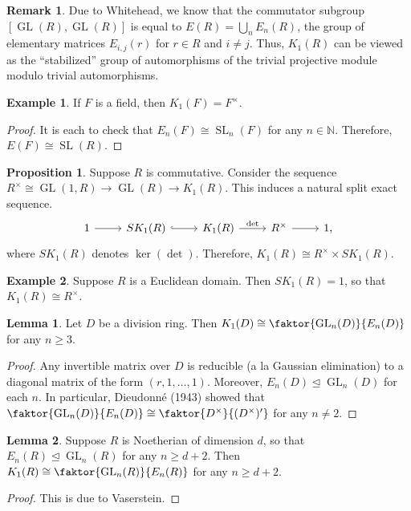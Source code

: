\documentclass[10pt,letterpaper,cm]{nupset}
\theoremstyle{definition}
\newtheorem{exmp}{Example}
\newtheorem{remark}{Remark}
\newtheorem{lemma}{Lemma}
\newtheorem{prop}{Proposition}
\newcommand{\N}{\mathbb N}
\newcommand{\1}{\mathbf{1}}
\newcommand{\0}{\vec 0}
\DeclareMathOperator*{\GL}{GL}
\DeclareMathOperator*{\SL}{SL}
\begin{document}
\begin{remark}
Due to Whitehead, we know that the commutator subgroup $[\GL(R), \GL(R)]$ is equal to $E(R) = \bigcup_n E_n(R)$, the group of elementary matrices $E_{i, j}(r)$ for $r \in R$ and $i\ne j$. Thus, $K_1(R)$ can be viewed as the ``stabilized'' group of automorphisms of the trivial projective module modulo trivial automorphisms.
\end{remark}

\begin{exmp}
If $F$ is a field, then $K_1(F) = F^{\times}$.
\end{exmp}
\begin{proof}
It is each to check that $E_n(F) \cong \SL_n(F)$ for any $n\in \N$. Therefore, $E(F) \cong \SL(R)$.
\end{proof}

\begin{prop}
Suppose $R$ is commutative. Consider the sequence $R^{\times} \cong \GL(1, R) \to \GL(R) \to K_1(R)$. This induces a natural split exact sequence.
\[
\begin{tikzcd}
1 \arrow[r] & SK_1(R) \arrow[r, hook] & K_1(R) \arrow[r, "\det"] & R^{\times} \arrow[r] & 1,
\end{tikzcd}
\]
where $SK_1(R)$ denotes $\ker(\det)$. Therefore, $K_1(R) \cong R^{\times} \times SK_1(R)$.
\end{prop}

\begin{exmp}
Suppose $R$ is a Euclidean domain. Then $SK_1(R) =1$, so that $K_1(R) \cong R^{\times}$.
\end{exmp}

\begin{lemma}
Let $D$ be a division ring. Then $K_1(D) \cong \faktor{\GL_n(D)}{E_n(D)}$ for any $n\geq 3$.
\end{lemma}
\begin{proof}
Any invertible matrix over $D$ is reducible (a la Gaussian elimination) to a diagonal matrix of the form $(r, 1, \ldots, 1)$. Moreover, $E_n(D)\unlhd \GL_n(D)$ for each $n$. In particular, Dieudonn\'e (1943) showed that  $\faktor{\GL_n(D)}{E_n(D)} \cong \faktor{D^{\times}}{(D^{\times})'}$ for any $n\ne 2$. 
\end{proof}

\begin{lemma}
Suppose $R$ is Noetherian of dimension $d$, so that $E_n(R)\unlhd \GL_n(R)$ for any $n\geq d+2$. Then $K_1(R) \cong \faktor{\GL_n(R)}{E_n(R)}$ for any $n \geq d+2$. 
\end{lemma}
\begin{proof}
This is due to Vaserstein.
\end{proof}
\end{document}
